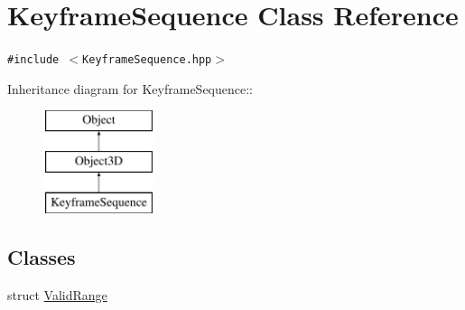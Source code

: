 \hypertarget{classm3g_1_1KeyframeSequence}{
\section{KeyframeSequence Class Reference}
\label{classm3g_1_1KeyframeSequence}
}
{\tt \#include $<$KeyframeSequence.hpp$>$}

Inheritance diagram for KeyframeSequence::\begin{figure}[H]
\begin{center}
\leavevmode
\includegraphics[height=3cm]{classm3g_1_1KeyframeSequence}
\end{center}
\end{figure}
\subsection*{Classes}
\begin{CompactItemize}
\item 
struct \hyperlink{structm3g_1_1KeyframeSequence_1_1ValidRange}{ValidRange}
\end{CompactItemize}
